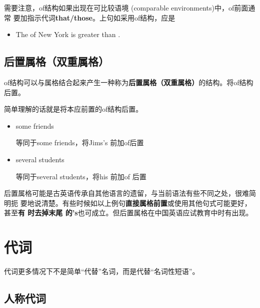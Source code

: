 需要注意，of结构如果出现在可比较语境 (comparable environments)中，of前面通常
要加指示代词\textbf{that/those}。上句如采用of结构，应是
\begin{itemize}
\item The  of New York is greater than .
\end{itemize}

\subsection{后置属格（双重属格）}

of结构可以与属格结合起来产生一种称为\textbf{后置属格（双重属格）}的结构。将of结构
后置。

简单理解的话就是将本应前置的of结构后置。

\begin{itemize}
\item some friends 

  等同于some  friends，将Jims's 前加of后置

\item several students 

  等同于several  students，将his 前加of 后置
\end{itemize}

后置属格可能是古英语传承自其他语言的遗留，与当前语法有些不同之处，很难简明扼
要地说清楚。有些时候如以上例句\textbf{直接属格前置}或使用其他句式可能更好，甚至\textbf{有
  时去掉末尾 的's}也可成立。但后置属格在中国英语应试教育中时有出现。


\section{代词}

代词更多情况下不是简单“代替”名词，而是代替“名词性短语”。

\subsection{人称代词}


